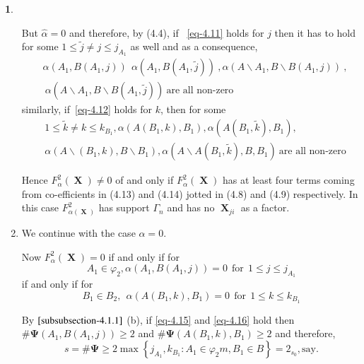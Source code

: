 \documentclass[a4paper,12pt]{article}
\DeclareMathOperator{\x}{\mathrm{X}}
\theoremstyle{definition}
\theoremstyle{underlinethm}
\theoremstyle{definition}
\newtheorem{subsubsec}{}[subsection]
\begin{document}
\begin{subsubsec}
\begin{enumerate}[label=(\alph*)]
But $\hat{\alpha} = 0$ and therefore, by (4.4), if ~\eqref{eq-4.11} holds for $j$ then it has to hold for some $1 \leq \tilde{j} \neq j \leq j_{A_{1}}$ as well and as a consequence, 
\begin{align*}
&\alpha\left(A_{1}, B(A_{1}, j)\right)~~\alpha \left(A_{1}, B(A_{1}, \tilde{j}) \right)~, \alpha\left(A\smallsetminus A_{1}, B\smallsetminus B(A_{1}, j)\right)~,\\
  &~\alpha\left(A \smallsetminus A_{1}, B \smallsetminus B(A_{1}, \tilde{j})\right)~ \text{are all non-zero}~\tag{4.13}\label{eq-4.13}
\end{align*}
similarly, if~\eqref{eq-4.12} holds for $k$, then for some 
\begin{align*}
&1 \leq \tilde{k} \neq k \leq k_{B_{1}}, \alpha(A (B_{1}, k), B_{1}), \alpha\left(A(B_{1}, \tilde{k}), B_{1}\right),\\
& \alpha(A \smallsetminus(B_{1}, k), B\smallsetminus B_{1}), \alpha(A \smallsetminus A (B_{1}, \tilde{k}), B, B_{1})~ \text{are all non-zero}\tag{4.14}\label{eq-4.14} 
\end{align*}

Hence $F_{\alpha}^{2}(\boldsymbol{\x}) \neq 0$ of and only if $F_{\alpha}^{2}(\boldsymbol{\x})$ has at least four terms coming from co-efficients in (4.13) and (4.14) jotted in (4.8) and (4.9) respectively. In this case $F^{2}_{\alpha({\boldsymbol{\x}})}$ has support $\Gamma_{n}$ and has no $\boldsymbol{\x}_{j i}$ as a factor.

\item We continue with the case $\hat{\alpha} = 0$.

Now $F_{\alpha}^{2}(\boldsymbol{\x}) =0$ if and only if for 
\begin{equation}
A_{1} \in \varphi_{2}, \alpha(A_{1}, B(A_{1}, j))=0~~ \text{for}~~ 1 \leq j \leq j_{A_{1}}\tag{4.15}\label{eq-4.15}
\end{equation} 
if and only if for 
\begin{equation}
B_{1} \in B_{2},~~ \alpha(A(B_{1}, k), B_{1}) =0 ~~\text{for}~~ 1 \leq k \leq k_{B_{1}}\tag{4.16}\label{eq-4.16}
\end{equation}

By $\eqref{subsubsection-4.1.1}$ (b), if \eqref{eq-4.15} and \eqref{eq-4.16} hold then $\# \boldsymbol{\Psi}(A_{1}, B(A_{1}, j))\geq 2$ and $\# \boldsymbol{\Psi} (A(B_{1}, k), B_{1}) \geq 2$ and therefore, 
$$
s= \# \boldsymbol{\Psi} \geq 2 \max \left\{j_{A_{1}}, k_{B_{1}} : A_{1} \in \varphi_{2}m, B_{1} \in B\right\}=2_{s_{0}}, \text{say}.
$$


\end{enumerate}
\end{subsubsec}
\end{document}
